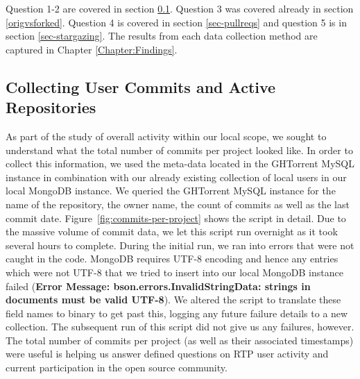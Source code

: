 Question 1-2 are covered in section \ref{sec-commits}. Question 3 was covered already in section \ref{origvsforked}. Question 4 is covered in section \ref{sec-pullreqs} and question 5 is in section \ref{sec-stargazing}. The results from each data collection method are captured in Chapter \ref{Chapter:Findings}.

\subsection{Collecting User Commits and Active Repositories}
\label{sec-commits}
As part of the study of overall activity within our local scope, we sought to understand what the total number of commits per project looked like. In order to collect this information, we used the meta-data located in the GHTorrent MySQL instance in combination with our already existing collection of local users in our local MongoDB instance. We queried the GHTorrent MySQL instance for the name of the repository, the owner name, the count of commits as well as the last commit date. Figure~\ref{fig:commits-per-project} shows the script in detail. Due to the massive volume of commit data, we let this script run overnight as it took several hours to complete. During the initial run, we ran into errors that were not caught in the code. MongoDB requires UTF-8 encoding and hence any entries which were not UTF-8 that we tried to insert into our local MongoDB instance failed (\textbf{Error Message: bson.errors.InvalidStringData: strings in documents must be valid UTF-8}). We altered the script to translate these field names to binary to get past this, logging any future failure details to a new collection. The subsequent run of this script did not give us any failures, however. The total number of commits per project (as well as their associated timestamps) were useful is helping us answer defined questions on RTP user activity and current participation in the open source community.

